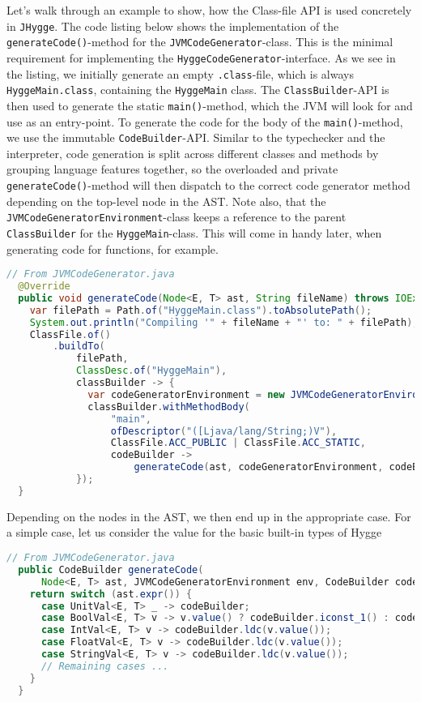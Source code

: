 Let's walk through an example to show, how the Class-file API is used concretely in \texttt{JHygge}. The code listing below shows
the implementation of the \texttt{generateCode()}-method for the \texttt{JVMCodeGenerator}-class. This is the minimal requirement
for implementing the \texttt{HyggeCodeGenerator}-interface. As we see in the listing, we initially generate an empty \texttt{.class}-file,
which is always \texttt{HyggeMain.class}, containing the \texttt{HyggeMain} class. The \texttt{ClassBuilder}-API is then used to
generate the static \texttt{main()}-method, which the JVM will look for and use as an entry-point. To generate the code for
the body of the \texttt{main()}-method, we use the immutable \texttt{CodeBuilder}-API. Similar to the typechecker and the interpreter,
code generation is split across different classes and methods by grouping language features together, so the overloaded and private
\texttt{generateCode()}-method will then dispatch to the correct code generator method depending on the top-level node in the AST.
Note also, that the \texttt{JVMCodeGeneratorEnvironment}-class keeps a reference to the parent \texttt{ClassBuilder} for the
\texttt{HyggeMain}-class. This will come in handy later, when generating code for functions, for example.

\begin{lstlisting}[language=Java]
  // From JVMCodeGenerator.java
  @Override
  public void generateCode(Node<E, T> ast, String fileName) throws IOException {
    var filePath = Path.of("HyggeMain.class").toAbsolutePath();
    System.out.println("Compiling '" + fileName + "' to: " + filePath);
    ClassFile.of()
        .buildTo(
            filePath,
            ClassDesc.of("HyggeMain"),
            classBuilder -> {
              var codeGeneratorEnvironment = new JVMCodeGeneratorEnvironment(classBuilder);
              classBuilder.withMethodBody(
                  "main",
                  ofDescriptor("([Ljava/lang/String;)V"),
                  ClassFile.ACC_PUBLIC | ClassFile.ACC_STATIC,
                  codeBuilder ->
                      generateCode(ast, codeGeneratorEnvironment, codeBuilder).return_());
            });
  }
\end{lstlisting}

Depending on the nodes in the AST, we then end up in the appropriate case. For a simple case, let us consider the value
for the basic built-in types of Hygge

\begin{lstlisting}[language=Java]
  // From JVMCodeGenerator.java
  public CodeBuilder generateCode(
      Node<E, T> ast, JVMCodeGeneratorEnvironment env, CodeBuilder codeBuilder) {
    return switch (ast.expr()) {
      case UnitVal<E, T> _ -> codeBuilder;
      case BoolVal<E, T> v -> v.value() ? codeBuilder.iconst_1() : codeBuilder.iconst_0();
      case IntVal<E, T> v -> codeBuilder.ldc(v.value());
      case FloatVal<E, T> v -> codeBuilder.ldc(v.value());
      case StringVal<E, T> v -> codeBuilder.ldc(v.value());
      // Remaining cases ... 
    }
  }
 
\end{lstlisting}

